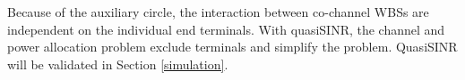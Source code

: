 

Because of the auxiliary circle, the interaction between co-channel WBSs are independent on the individual end terminals. 
With quasiSINR, the channel and power allocation problem exclude terminals and simplify the problem. 
QuasiSINR will be validated in Section \ref{simulation}. 

